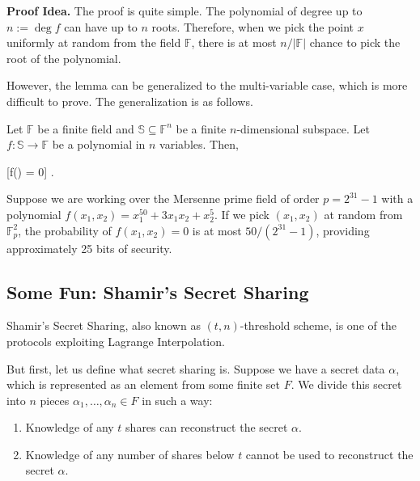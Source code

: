 \documentclass[../lecture-notes-148x210.tex]{subfiles}
\begin{document}
\vspace{-0.6mm}

\textbf{Proof Idea.} The proof is quite simple. The polynomial of degree up to
$n:=\deg f$ can have up to $n$ roots. Therefore, when we pick the point $x$
uniformly at random from the field $\mathbb{F}$, there is at most $n/|\mathbb{F}|$
chance to pick the root of the polynomial.

However, the lemma can be generalized to the multi-variable case, which is more
difficult to prove. The generalization is as follows.

\vspace{-0.6mm}

\begin{lemma} \label{lemma:sz} Let $\mathbb{F}$
    be a finite field and $\mathbb{S} \subseteq \mathbb{F}^n$ be a finite
    $n$-dimensional subspace. Let $f: \mathbb{S} \to \mathbb{F}$ be a polynomial
    in $n$ variables. Then,
    
    \vspace{-1.1mm}
    
    \begin{xequation}
        [f() = 0] \leq {}.
    \end{xequation}
\end{lemma}

\vspace{-4.1mm}

\begin{example}
Suppose we are working over the Mersenne prime field of order $p=2^{31}-1$ with
a polynomial $f(x_1,x_2) = x_1^{50} + 3x_1x_2 + x_2^5$. If we pick $(x_1,x_2)$
at random from $\mathbb{F}_p^2$, the probability of $f(x_1,x_2) = 0$ is at most
$50/(2^{31}-1)$, providing approximately 25 bits of security.
\end{example}

\subsection{Some Fun: Shamir's Secret Sharing}

Shamir's Secret Sharing, also known as $(t,n)$-threshold scheme, is one of the protocols exploiting Lagrange Interpolation. 

But first, let us define what secret sharing is. Suppose we have a secret data $\alpha$, which is represented as an element from some finite set $F$. We divide this secret into $n$ pieces $\alpha_1,\dots,\alpha_n \in F$ in such a way:
\begin{enumerate}
    \item Knowledge of any $t$ shares can reconstruct the secret $\alpha$.
    \item Knowledge of any number of shares below $t$ cannot be used to reconstruct the secret $\alpha$.
\end{enumerate}
\end{document}

